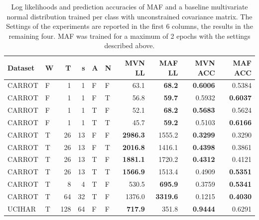 \documentclass[11pt,titlepage,oneside,openany]{book}
\begin{document}
\begin{table}
	\centering
	\tiny
\begin{tabularx}{0.97\textwidth}{llrrllrrrr}
	\toprule
	Dataset &  W &  T &  s &  A &  N &    MVN LL &    MAF LL &  MVN ACC &  MAF ACC \\
	\midrule
	CARROT &   F &       1 &       1 &    F &  F &   63.1 &   \textbf{68.2} &   \textbf{0.6006} &   0.5384 \\
	CARROT &   F &       1 &       1 &    F &   T &   56.8 &   \textbf{59.7} &   0.5932 &   \textbf{0.6037} \\
	CARROT &   F &       1 &       1 &     T &  F &   52.1 &   \textbf{68.2} &  \textbf{0.5683} &   0.5624 \\
	CARROT &   F &       1 &       1 &     T &   T &   45.7 &   \textbf{59.2} &   0.5103 &   \textbf{0.6166} \\
	CARROT &   T &      26 &      13 &    F &  F & \textbf{2986.3} & 1555.2 &   \textbf{0.3299} &   0.3290 \\
	CARROT &   T &      26 &      13 &    F &   T & \textbf{2016.8} & 1416.1 &   \textbf{0.4398} &   0.3861 \\
	CARROT &   T &      26 &      13 &     T &  F & \textbf{1881.1} & 1720.2 &   \textbf{0.4312} &   0.4121 \\
	CARROT &   T &      26 &      13 &     T &   T & \textbf{1566.9} & 1513.4 &   0.4909 &   \textbf{0.5351} \\
	CARROT &   T &       8 &       4 &     T &  F &  530.5 & \textbf{695.9} &   0.3759 &   \textbf{0.5341} \\
	CARROT &   T &      64 &      32 &     T &  F & 1376.0 & \textbf{3319.6} &   0.1215 &   \textbf{0.4030} \\
	UCIHAR &   T &     128 &      64 &    F &  F &  \textbf{717.9} &  351.8 &   \textbf{0.9444} &   0.6291 \\
	\bottomrule
\end{tabularx}
\caption[Evaluation Results Carrot]{\label{tab:2eps} Log likelihoods and prediction accuracies of MAF and a baseline multivariate normal distribution trained per class with unconstrained covariance matrix. The Settings of the experiments are reported in the first 6 columns, the results in the remaining four. MAF was trained for a maximum of 2 epochs with the settings described above.}
\end{table}
\end{document}
